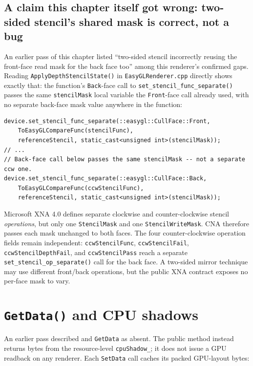 \subsection{A claim this chapter itself got wrong: two-sided stencil's shared mask is correct, not a bug}

An earlier pass of this chapter listed ``two-sided stencil incorrectly reusing the front-face
read mask for the back face too'' among this renderer's confirmed gaps. Reading
\texttt{ApplyDepthStencilState()} in \texttt{EasyGLRenderer.cpp} directly shows exactly
that: the function's \texttt{Back}-face call to
\texttt{set\_stencil\_func\_separate()} passes the same \texttt{stencilMask} local
variable the \texttt{Front}-face call already used, with no separate
back-face mask value anywhere in the function:

\begin{lstlisting}
device.set_stencil_func_separate(::easygl::CullFace::Front,
    ToEasyGLCompareFunc(stencilFunc),
    referenceStencil, static_cast<unsigned int>(stencilMask));
// ...
// Back-face call below passes the same stencilMask -- not a separate ccw one.
device.set_stencil_func_separate(::easygl::CullFace::Back,
    ToEasyGLCompareFunc(ccwStencilFunc),
    referenceStencil, static_cast<unsigned int>(stencilMask));
\end{lstlisting}

Microsoft XNA 4.0 defines separate clockwise and counter-clockwise stencil \emph{operations},
but only one \texttt{StencilMask} and one \texttt{StencilWriteMask}. CNA therefore passes each
mask unchanged to both faces. The four counter-clockwise operation fields remain independent:
\texttt{ccwStencilFunc}, \texttt{ccwStencilFail}, \texttt{ccwStencilDepthFail}, and
\texttt{ccwStencilPass} reach a separate \texttt{set\_stencil\_op\_separate()} call for the back
face. A two-sided mirror technique may use different front/back operations, but the public XNA
contract exposes no per-face mask to vary.

\section{\texttt{GetData()} and CPU shadows}
\label{sec:easygl-getdata-shadow}

An earlier pass described  and 
\texttt{GetData} as absent. The public method instead returns bytes from the resource-level
\texttt{cpuShadow\_}; it does not issue a GPU readback on any renderer. Each \texttt{SetData}
call caches its packed GPU-layout bytes:

